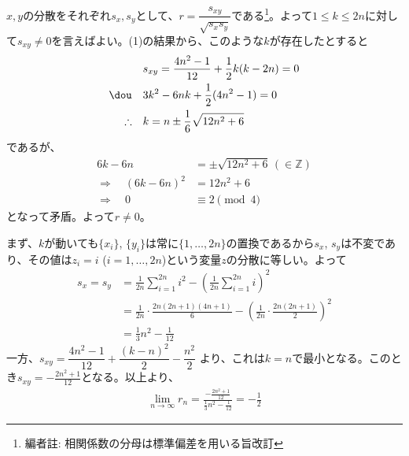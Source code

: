$x,y$の分散をそれぞれ$s_x, s_y$として、$r=\dfrac{s_{xy}}{\sqrt{s_xs_y}}$である\footnote{編者註: 相関係数の分母は標準偏差を用いる旨改訂}。よって$1\le k\le 2n$に対して$s_{xy}\neq 0$を言えばよい。(1)の結果から、このような$k$が存在したとすると
\begin{align*}
 & s_{xy}=\frac{4n^2-1}{12}+\frac{1}{2}k(k-2n)=0 \\
 \dou\quad & 3k^2-6nk+\frac{1}{2}(4n^2-1)=0 \\
 \therefore\quad & k=n\pm \frac{1}{6}\sqrt{12n^2+6}
\end{align*}
であるが、
\begin{align*}
 6k-6n&=\pm\sqrt{12n^2+6} \,(\in\mathbb{Z}) \\
 \Rightarrow \quad (6k-6n)^2&=12n^2+6 \\
 \Rightarrow \quad 0&\equiv 2 \pmod{4}
\end{align*}
となって矛盾。よって$r\neq 0$。

まず、$k$が動いても$\{x_i\}$, $\{y_i\}$は常に$\{1,\dots,2n\}$の置換であるから$s_x$, $s_y$は不変であり、その値は$z_i=i$ ($i=1,\dots,2n$)という変量$z$の分散に等しい。よって
\begin{align*}
 s_x=s_y&=\frac{1}{2n}\sum_{i=1}^{2n}i^2-\left(\frac{1}{2n}\sum_{i=1}^{2n}i\right)^2 \\
 &=\frac{1}{2n}\cdot\frac{2n(2n+1)(4n+1)}{6}-\left(\frac{1}{2n}\cdot\frac{2n(2n+1)}{2}\right)^2 \\
 &=\frac{1}{3}n^2-\frac{1}{12}
\end{align*}
一方、$s_{xy}=\dfrac{4n^2-1}{12}+\dfrac{(k-n)^2}{2}-\dfrac{n^2}{2}$ より、これは$k=n$で最小となる。このとき$s_{xy}=-\frac{2n^2+1}{12}$となる。以上より、
\begin{align*}
 \lim_{n\to\infty}r_n=\frac{-\frac{2n^2+1}{12}}{\frac{1}{3}n^2-\frac{1}{12}}=-\frac{1}{2} 
\end{align*}